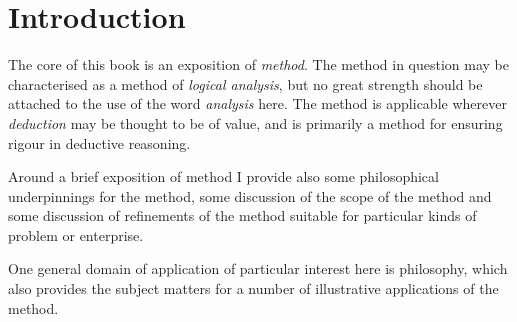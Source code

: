 \chapter{Introduction}\label{Introduction}

The core of this book is an exposition of \emph{method}.
The method in question may be characterised as a method of
\emph{logical analysis}, but no great strength should be attached to
the use of the word \emph{analysis} here.
The method is applicable wherever \emph{deduction} may be thought to
be of value, and is primarily a method for ensuring rigour in
deductive reasoning.

Around a brief exposition of method I provide also some philosophical
underpinnings for the method, some discussion of the scope of the
method and some discussion of refinements of the method suitable for
particular kinds of problem or enterprise.

One general domain of application of particular interest here is
philosophy, which also provides the subject matters for a number of
illustrative applications of the method.

